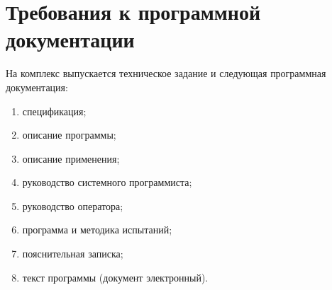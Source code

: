 \newpage\section{Требования к программной документации}\label{section:Требования к программной документации}

На комплекс \algoname{} выпускается техническое задание и следующая
программная документация:

\begin{enumerate}
\item спецификация;
\item описание программы;
\item описание применения;
\item руководство системного программиста;
\item руководство оператора;
\item программа и методика испытаний;
\item пояснительная записка;
\item текст программы (документ электронный).
\end{enumerate}